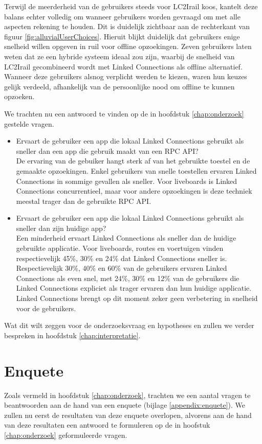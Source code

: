 Terwijl de meerderheid van de gebruikers steeds voor LC2Irail koos, kantelt deze balans echter volledig om wanneer gebruikers worden gevraagd om met alle aspecten rekening te houden. Dit is duidelijk zichtbaar aan de rechterkant van figuur \ref{fig:alluvialUserChoices}. Hieruit blijkt duidelijk dat gebruikers enige snelheid willen opgeven in ruil voor offline opzoekingen. Zeven gebruikers laten weten dat ze een hybride systeem ideaal zou zijn, waarbij de snelheid van LC2Irail gecombineerd wordt met Linked Connections als offline alternatief. Wanneer deze gebruikers alsnog verplicht werden te kiezen, waren hun keuzes gelijk verdeeld, afhankelijk van de persoonlijke nood om offline te kunnen opzoeken. 


We trachten nu een antwoord te vinden op de in hoofdstuk \ref{chap:onderzoek} gestelde vragen.
\begin{itemize}
	\item Ervaart de gebruiker een app die lokaal Linked Connections gebruikt als sneller dan een app die gebruik maakt van een RPC API?\\
	De ervaring van de gebuiker hangt sterk af van het gebruikte toestel en de gemaakte opzoekingen. Enkel gebruikers van snelle toestellen ervaren Linked Connections in sommige gevallen als sneller. Voor liveboards is Linked Connections concurrentieel, maar voor andere opzoekingen is deze techniek meestal trager dan de gebruikte RPC API.
	\item Ervaart de gebruiker een app die lokaal Linked Connections gebruikt als sneller dan zijn huidige app?\\
	Een minderheid ervaart Linked Connections als sneller dan de huidige gebruikte applicatie. Voor liveboards, routes en voertuigen vinden respectievelijk 45\%, 30\% en 24\% dat Linked Connections sneller is. Respectievelijk 30\%, 40\% en 60\% van de gebruikers ervaren Linked Connections als even snel, met 24\%, 30\% en 12\% van de gebruikers die Linked Connections expliciet als trager ervaren dan hun huidige applicatie. Linked Connections brengt op dit moment zeker geen verbetering in snelheid voor de gebruikers.
\end{itemize}

Wat dit wilt zeggen voor de onderzoeksvraag en hypotheses en zullen we verder bespreken in hoofdstuk \ref{chap:interpretatie}.

\section{Enquete}
Zoals vermeld in hoofdstuk \ref{chap:onderzoek}, trachten we een aantal vragen te beantwoorden aan de hand van een enquete (bijlage \ref{appendix:enquete}). We zullen nu eerst de resultaten van deze enquete overlopen, alvorens aan de hand van deze resultaten een antwoord te formuleren op de in hoofstuk \ref{chap:onderzoek} geformuleerde vragen.

